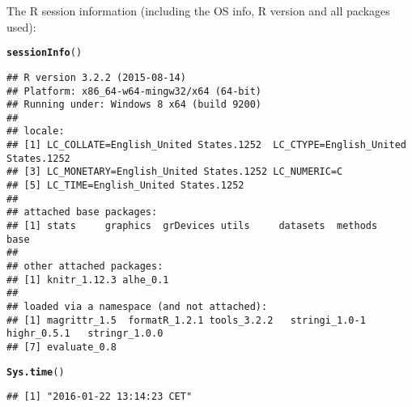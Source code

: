 \documentclass{article}\usepackage[]{graphicx}\usepackage[]{color}
\makeatletter
\newcommand{\hlstd}[1]{\textcolor[rgb]{0.345,0.345,0.345}{#1}}%
\newcommand{\hlkwd}[1]{\textcolor[rgb]{0.737,0.353,0.396}{\textbf{#1}}}%
\newenvironment{kframe}{%
 \def\at@end@of@kframe{}%
 \ifinner\ifhmode%
  \def\at@end@of@kframe{\end{minipage}}%
  \begin{minipage}{\columnwidth}%
 \fi\fi%
 \def\FrameCommand##1{\hskip\@totalleftmargin \hskip-\fboxsep
 \colorbox{shadecolor}{##1}\hskip-\fboxsep
     \hskip-\linewidth \hskip-\@totalleftmargin \hskip\columnwidth}%
 \MakeFramed {\advance\hsize-\width
   \@totalleftmargin\z@ \linewidth\hsize
   \@setminipage}}%
 {\par\unskip\endMakeFramed%
 \at@end@of@kframe}
\newenvironment{knitrout}{}{} %
\makeatother
\begin{document}
The R session information (including the OS info, R version and all
packages used):

\begin{knitrout}
\color{fgcolor}\begin{kframe}
\begin{alltt}
\hlkwd{sessionInfo}\hlstd{()}
\end{alltt}
\begin{verbatim}
## R version 3.2.2 (2015-08-14)
## Platform: x86_64-w64-mingw32/x64 (64-bit)
## Running under: Windows 8 x64 (build 9200)
## 
## locale:
## [1] LC_COLLATE=English_United States.1252  LC_CTYPE=English_United States.1252   
## [3] LC_MONETARY=English_United States.1252 LC_NUMERIC=C                          
## [5] LC_TIME=English_United States.1252    
## 
## attached base packages:
## [1] stats     graphics  grDevices utils     datasets  methods   base     
## 
## other attached packages:
## [1] knitr_1.12.3 alhe_0.1    
## 
## loaded via a namespace (and not attached):
## [1] magrittr_1.5  formatR_1.2.1 tools_3.2.2   stringi_1.0-1 highr_0.5.1   stringr_1.0.0
## [7] evaluate_0.8
\end{verbatim}
\begin{alltt}
\hlkwd{Sys.time}\hlstd{()}
\end{alltt}
\begin{verbatim}
## [1] "2016-01-22 13:14:23 CET"
\end{verbatim}
\end{kframe}
\end{knitrout}
\end{document}

